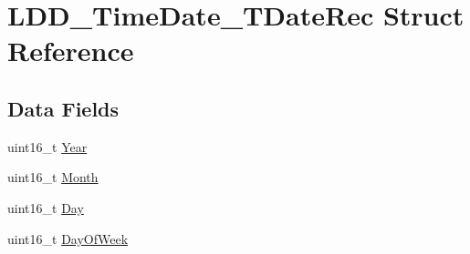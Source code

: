 \hypertarget{struct_l_d_d___time_date___t_date_rec}{\section{L\-D\-D\-\_\-\-Time\-Date\-\_\-\-T\-Date\-Rec Struct Reference}
\label{struct_l_d_d___time_date___t_date_rec}
}
\subsection*{Data Fields}
\begin{DoxyCompactItemize}
\item 
uint16\-\_\-t \hyperlink{struct_l_d_d___time_date___t_date_rec_a58eee644efb4f46adc3437063c7bc194}{Year}
\item 
uint16\-\_\-t \hyperlink{struct_l_d_d___time_date___t_date_rec_a28aaeffe98b07d60db379d12269fa822}{Month}
\item 
uint16\-\_\-t \hyperlink{struct_l_d_d___time_date___t_date_rec_a6f1463c1917d6fe55a492bdb85a6bd17}{Day}
\item 
uint16\-\_\-t \hyperlink{struct_l_d_d___time_date___t_date_rec_a11ed8bc2e3fbd80252a7d4802d316f1c}{Day\-Of\-Week}
\end{DoxyCompactItemize}


